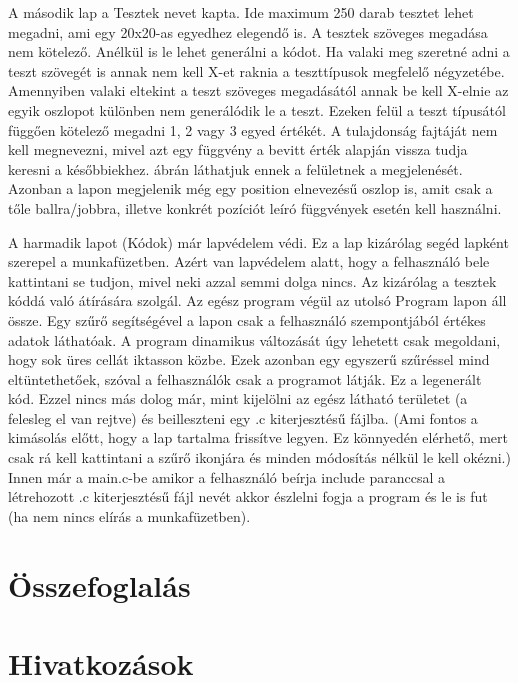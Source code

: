 \documentclass[12ppt,a4paper,oneside]{report}
\begin{document}
    A második lap a Tesztek nevet kapta. Ide maximum 250 darab tesztet lehet megadni, ami egy 20x20-as egyedhez elegendő is.
    A tesztek szöveges megadása nem kötelező.
    Anélkül is le lehet generálni a kódot.
    Ha valaki meg szeretné adni a teszt szövegét is annak nem kell X-et raknia a teszttípusok megfelelő négyzetébe.
    Amennyiben valaki eltekint a teszt szöveges megadásától annak be kell X-elnie az egyik oszlopot különben nem generálódik le a teszt.
    Ezeken felül a teszt típusától függően kötelező megadni 1, 2 vagy 3 egyed értékét.
    A tulajdonság fajtáját nem kell megnevezni, mivel azt egy függvény a bevitt érték alapján vissza tudja keresni a későbbiekhez.
     ábrán láthatjuk ennek a felületnek a megjelenését.
    Azonban a lapon megjelenik még egy position elnevezésű oszlop is, amit csak a tőle ballra/jobbra, illetve konkrét pozíciót leíró függvények esetén kell használni.
    
    A harmadik lapot (Kódok) már lapvédelem védi.
    Ez a lap kizárólag segéd lapként szerepel a munkafüzetben.
    Azért van lapvédelem alatt, hogy a felhasználó bele kattintani se tudjon, mivel neki azzal semmi dolga nincs. Az kizárólag a tesztek kóddá való átírására szolgál.
    Az egész program végül az utolsó Program lapon áll össze.
    Egy szűrő segítségével a lapon csak a felhasználó szempontjából értékes adatok láthatóak.
    A program dinamikus változását úgy lehetett csak megoldani, hogy sok üres cellát iktasson közbe.
    Ezek azonban egy egyszerű szűréssel mind eltüntethetőek, szóval a felhasználók csak a programot látják. Ez a legenerált kód.
    Ezzel nincs más dolog már, mint kijelölni az egész látható területet (a felesleg el van rejtve) és beilleszteni egy .c kiterjesztésű fájlba. (Ami fontos a kimásolás előtt, hogy a lap tartalma frissítve legyen.
    Ez könnyedén elérhető, mert csak rá kell kattintani a szűrő ikonjára és minden módosítás nélkül le kell okézni.)
    Innen már a main.c-be amikor a felhasználó beírja include paranccsal a létrehozott .c kiterjesztésű fájl nevét akkor észlelni fogja a program és le is fut (ha nem nincs elírás a munkafüzetben).

\chapter{Összefoglalás} %

\chapter*{Hivatkozások}


\end{document}

